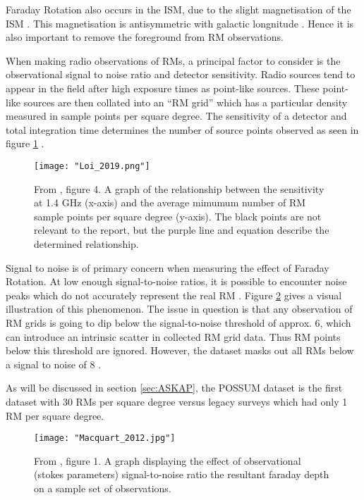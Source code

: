 Faraday Rotation also occurs in the ISM, due to the slight magnetisation of the ISM \citep{ID37, ID30, ID21}. This magnetisation is antisymmetric with galactic longnitude \citep{ID30}. Hence it is also important to remove the foreground from RM observations.


When making radio observations of RMs, a principal factor to consider is the observational signal to noise ratio and detector sensitivity. Radio sources tend to appear in the field after high exposure times as point-like sources. These point-like sources are then collated into an “RM grid” which has a particular density measured in sample points per square degree. The sensitivity of a detector and total integration time determines the number of source points observed as seen in figure \ref{fig:loi} \citep{ID59}.

\begin{figure}
    \texttt{[image: "Loi\_2019.png"]}
    \centering
    \caption{From \cite{ID59}, figure 4. A graph of the relationship between the sensitivity at 1.4 GHz (x-axis) and the average mimumum number of RM sample points per square degree (y-axis). The black points are not relevant to the report, but the purple line and equation describe the determined relationship.}
    \label{fig:loi}
\end{figure}

Signal to noise is of primary concern when measuring the effect of Faraday Rotation. At low enough signal-to-noise ratios, it is possible to encounter noise peaks which do not accurately represent the real RM \citep{ID60}. Figure \ref{fig:snr} gives a visual illustration of this phenomenon. The issue in question is that any observation of RM grids is going to dip below the signal-to-noise threshold of approx. 6, which can introduce an intrinsic scatter in collected RM grid data. Thus RM points below this threshold are ignored. However, the dataset masks out all RMs below a signal to noise of 8 \citep{ID71}.

As will be discussed in section \ref{sec:ASKAP}, the POSSUM dataset is the first dataset with 30 RMs per square degree versus legacy surveys which had only 1 RM per square degree.

\begin{figure}
    \texttt{[image: "Macquart\_2012.jpg"]}
    \centering
    \caption{From \cite{ID60}, figure 1. A graph displaying the effect of observational (stokes parameters) signal-to-noise ratio the resultant faraday depth on a sample set of observations.}
    \label{fig:snr}
\end{figure}

